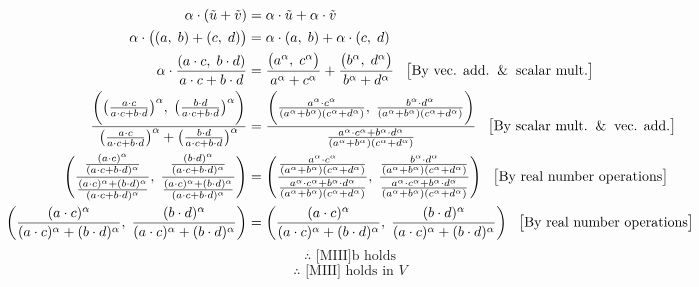 \documentclass[10pt]{article}
\begin{document}
{{{\begin{equation*}
    \end{equation*}
    \begin{align}
    \alpha\cdot(\tilde{u}+\tilde{v})&=\alpha\cdot\tilde{u}+\alpha\cdot\tilde{v}\\
    \alpha\cdot\big((a,\;b)+(c,\;d)\big)&=\alpha\cdot(a,\;b)+\alpha\cdot(c,\;d)\\
    \alpha\cdot\frac{(a\cdot c,\;b\cdot d)}{a\cdot c + b\cdot d}&=\frac{\big(a^\alpha,\;c^\alpha\big)}{a^\alpha+c^\alpha}+\frac{\big(b^\alpha,\;d^\alpha\big)}{b^\alpha+d^\alpha}\;\;\;\big[\text{By vec. add.}\And\text{scalar mult.}\big]\\
    \frac{\bigg(\big(\frac{a\cdot c}{a\cdot c + b\cdot d}\big)^\alpha,\;\big(\frac{b\cdot d}{a\cdot c + b\cdot d}\big)^\alpha\bigg)}{\big(\frac{a\cdot c}{a\cdot c + b\cdot d}\big)^\alpha+\big(\frac{b\cdot d}{a\cdot c + b\cdot d}\big)^\alpha}&=\frac{\bigg(\frac{a^\alpha\cdot c^\alpha}{(a^\alpha+b^\alpha)(c^\alpha+d^\alpha)},\;\frac{b^\alpha\cdot d^\alpha}{(a^\alpha+b^\alpha)(c^\alpha+d^\alpha)}\bigg)}{\frac{a^\alpha\cdot c^\alpha+b^\alpha\cdot d^\alpha}{(a^\alpha+b^\alpha)(c^\alpha+d^\alpha)}}\;\;\;\big[\text{By scalar mult.}\And\text{vec. add.}\big]\\
    \Bigg(\frac{\frac{(a\cdot c)^\alpha}{(a\cdot c+b\cdot d)^\alpha}}{\frac{(a\cdot c)^\alpha+(b\cdot d)^\alpha}{(a\cdot c+b\cdot d)^\alpha}},\;\frac{\frac{(b\cdot d)^\alpha}{(a\cdot c+b\cdot d)^\alpha}}{\frac{(a\cdot c)^\alpha+(b\cdot d)^\alpha}{(a\cdot c+b\cdot d)^\alpha}}\Bigg)&=\Bigg(\frac{\frac{a^\alpha\cdot c^\alpha}{(a^\alpha+b^\alpha)(c^\alpha+d^\alpha)}}{\frac{a^\alpha\cdot c^\alpha+b^\alpha\cdot d^\alpha}{(a^\alpha+b^\alpha)(c^\alpha+d^\alpha)}},\;\frac{\frac{b^\alpha\cdot d^\alpha}{(a^\alpha+b^\alpha)(c^\alpha+d^\alpha)}}{\frac{a^\alpha\cdot c^\alpha+b^\alpha\cdot d^\alpha}{(a^\alpha+b^\alpha)(c^\alpha+d^\alpha)}}\Bigg)\;\;\;\big[\text{By real number operations}\big]\\
    \bigg(\frac{(a\cdot c)^\alpha}{(a\cdot c)^\alpha+(b\cdot d)^\alpha},\;\frac{(b\cdot d)^\alpha}{(a\cdot c)^\alpha+(b\cdot d)^\alpha}\bigg)&=\bigg(\frac{(a\cdot c)^\alpha}{(a\cdot c)^\alpha+(b\cdot d)^\alpha},\;\frac{(b\cdot d)^\alpha}{(a\cdot c)^\alpha+(b\cdot d)^\alpha}\bigg)\;\;\;\big[\text{By real number operations}\big]
    \end{align}
    \begin{equation*}
    \therefore \text{ [MIII]b holds}
    \end{equation*}
        \begin{equation*}
    \end{equation*}
    \begin{equation*}
    \therefore \text{ [MIII] holds in }V
    \end{equation*}
	}
}



}
\end{document}
